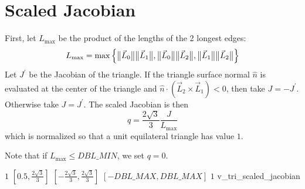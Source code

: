 \section{Scaled Jacobian\label{s:tri-scaled-jacobian}}

First, let $L_{\max}$ be the product of the lengths of the 2 longest edges:
\[
  L_{\max} = \max\left\{
    \big\lVert{\vec L_0}\big\rVert \big\lVert{\vec L_1}\big\rVert,
    \big\lVert{\vec L_0}\big\rVert \big\lVert{\vec L_2}\big\rVert,
    \big\lVert{\vec L_1}\big\rVert \big\lVert{\vec L_2}\big\rVert
  \right\}
\]
Let $J^{\prime}$ be the Jacobian of the triangle.
If the triangle surface normal $\hat n$ is evaluated at the center of the triangle
and $\hat n\cdot\left(\vec L_2\times\vec L_1\right) < 0$, then take $J = -J^{\prime}$.
Otherwise take $J = J^{\prime}$.
The scaled Jacobian is then
\[
  q = \frac{2\sqrt{3}}{3} \frac{J}{L_{\max}}
\]
which is normalized so that a unit equilateral triangle has value $1$.

Note that if $L_{\max} \leq DBL\_MIN$, we set $q = 0$.

%
{$1$}%
{$[0.5,\frac{2\sqrt{3}}{3}]$}%
{$[-\frac{2\sqrt{3}}{3},\frac{2\sqrt{3}}{3}]$}%
{$[-DBL\_MAX,DBL\_MAX]$}%
{$1$}%
{\cite{knu:00}}%
{v\_tri\_scaled\_jacobian}%

